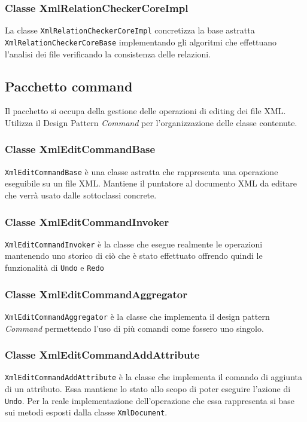 	\subsubsection{Classe XmlRelationCheckerCoreImpl}
		La classe \texttt{XmlRelationCheckerCoreImpl} concretizza la base astratta \texttt{XmlRelationCheckerCoreBase} implementando gli algoritmi che effettuano l'analisi dei file verificando la consistenza delle relazioni.

\subsection{Pacchetto command}
Il pacchetto si occupa della gestione delle operazioni di editing dei file XML. Utilizza il Design Pattern \textit{Command} per l'organizzazione delle classe contenute.

	\subsubsection{Classe XmlEditCommandBase}
		\texttt{XmlEditCommandBase} è una classe astratta che rappresenta una operazione eseguibile su un file XML. Mantiene il puntatore al documento XML da editare che verrà usato dalle sottoclassi concrete.
		
	\subsubsection{Classe XmlEditCommandInvoker}
		\texttt{XmlEditCommandInvoker} è la classe che esegue realmente le operazioni mantenendo uno storico di ciò che è stato effettuato offrendo quindi le funzionalità di \texttt{Undo} e \texttt{Redo}

	\subsubsection{Classe XmlEditCommandAggregator}
		\texttt{XmlEditCommandAggregator} è la classe che implementa il design pattern \textit{Command} permettendo l'uso di più comandi come fossero uno singolo.
		
	\subsubsection{Classe XmlEditCommandAddAttribute}
		\texttt{XmlEditCommandAddAttribute} è la classe che implementa il comando di aggiunta di un attributo. Essa mantiene lo stato allo scopo di poter eseguire l'azione di \texttt{Undo}. Per la reale implementazione dell'operazione che essa rappresenta si base sui metodi esposti dalla classe \texttt{XmlDocument}.
		
